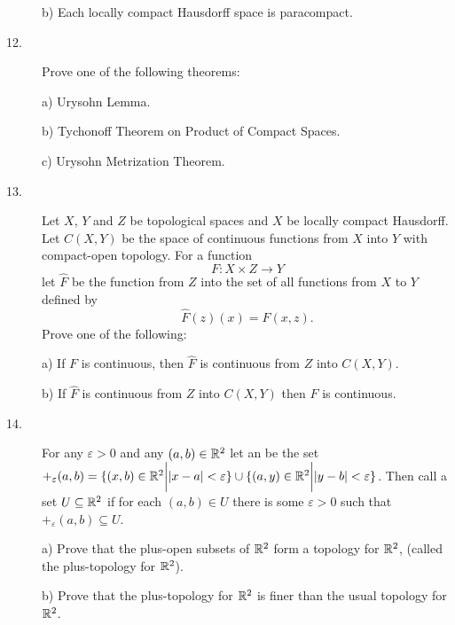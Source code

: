 \documentclass[bbb]{report}
\def\R{{\Bbb R}}
\begin{document}
\begin{Large}
\begin{description}
\item[\quad] b)
Each locally compact Hausdorff space is paracompact.

\item[12.]
Prove one of the following theorems:

\item[\quad] a)
Urysohn Lemma.

\item[\quad] b)
Tychonoff Theorem on Product of Compact Spaces.

\item[\quad] c)
Urysohn Metrization Theorem.

\item[13.]
Let $X$, $Y$ and $Z$ be topological spaces and $X$ be locally compact
Hausdorff. Let $C(X,Y)$ be the space of continuous functions from
$X$ into $Y$ with compact-open topology. For a function
$$ F:X\times Z\to Y$$
let $\hat F$ be the function from $Z$ into the set of all functions
from $X$ to $Y$ defined by
$$ \hat F (z)(x) = F(x,z). $$
Prove one of the following:


\item[\quad] a)
If $F$ is continuous, then  $\hat F$ is continuous from $Z$ into
$C(X,Y)$.

\item[\quad] b)
If $\hat F$ is continuous from $Z$ into $C(X,Y)$ then $F$ is continuous.


\vspace{.15in}
\item[14.]
For any $\varepsilon>0$ and any
$(a,b)\in {\Bbb R}^2$ let an
be the set
  $+_\varepsilon(a,b)=\{(x,b)\in\R^2\bigg| |x-a| <\varepsilon\}
   \cup \{(a,y)\in{\Bbb R}^2\bigg| |y-b|<\varepsilon\}$.
Then call a set $U\subseteq{\Bbb R}^2$ 
if for each $(a,b)\in U$ there is some $\varepsilon>0$ such that
$+_\varepsilon(a,b)\subseteq U$.

\item[\quad] a)
Prove that the plus-open subsets of ${\Bbb R}^2$ form a topology for
${\Bbb R}^2$, (called the plus-topology for ${\Bbb R}^2$).

\item[\quad] b)
Prove that the plus-topology for ${\Bbb R}^2$ is 
finer than the usual topology for ${\Bbb R}^2$.



\end{description}
\end{Large}
\end{document}
